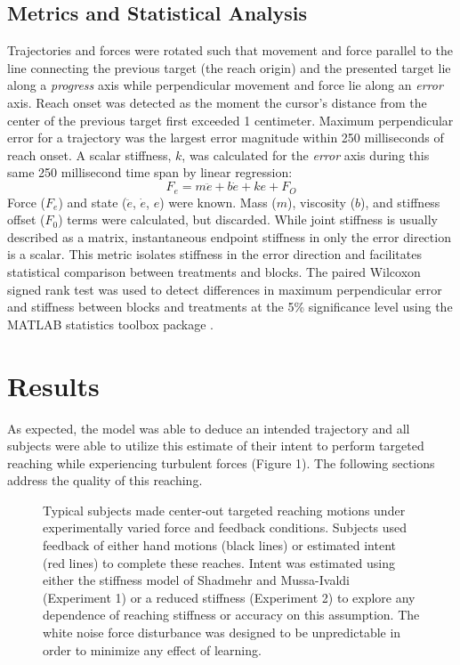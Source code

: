 \documentclass{frontiersSCNS} %
\begin{document}
\begin{methods}
\subsection{Metrics and Statistical Analysis}
Trajectories and forces were rotated such that movement and force parallel to the line connecting the previous target (the reach origin) and the presented target lie along a \textit{progress} axis while perpendicular movement and force lie along an \textit{error} axis. Reach onset was detected as the moment the cursor's distance from the center of the previous target first exceeded 1 centimeter. Maximum perpendicular error for a trajectory was the largest error magnitude within 250 milliseconds of reach onset. A scalar stiffness, $k$, was calculated for the \textit{error} axis during this same 250 millisecond time span by linear regression:
\begin{equation}
F_e=m\ddot{e}+b\dot{e}+ke+F_O
\end{equation}
Force ($F_e$) and state ($\ddot{e}$, $\dot{e}$, $e$) were known. Mass ($m$), viscosity ($b$), and stiffness offset ($F_0$) terms were calculated, but discarded. While joint stiffness is usually described as a matrix, instantaneous endpoint stiffness in only the error direction is a scalar. This metric isolates stiffness in the error direction and facilitates statistical comparison between treatments and blocks. The paired Wilcoxon signed rank test was used to detect differences in maximum perpendicular error and stiffness between blocks and treatments at the 5\% significance level using the MATLAB statistics toolbox package \cite{MATLAB:2014}.
\end{methods}


\section{Results}
As expected, the model was able to deduce an intended trajectory and all subjects were able to utilize this estimate of their intent to perform targeted reaching while experiencing turbulent forces (Figure 1). The following sections address the quality of this reaching.

\begin{figure}[h]
\centering
{}
\caption{Typical subjects made center-out targeted reaching motions under experimentally varied force and feedback conditions. Subjects used feedback of either hand motions (black lines) or estimated intent (red lines) to complete these reaches. Intent was estimated using either the stiffness model of Shadmehr and Mussa-Ivaldi\cite{shadmehr1994adaptive} (Experiment 1) or a reduced stiffness (Experiment 2) to explore any dependence of reaching stiffness or accuracy on this assumption. The white noise force disturbance was designed to be unpredictable in order to minimize any effect of learning.}
\label{Yplots}
\end{figure}
\end{document}
